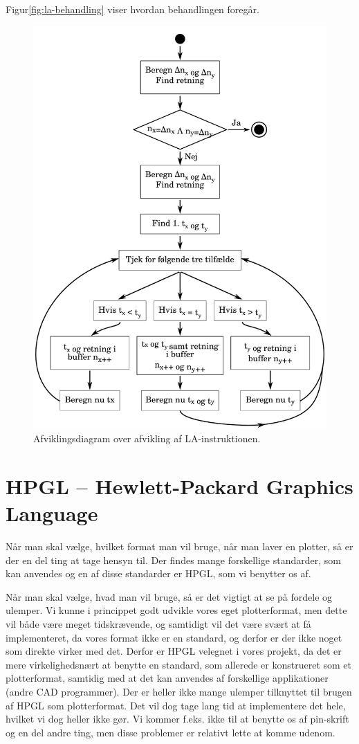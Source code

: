 Figur\vref{fig:la-behandling} viser hvordan behandlingen foregår.
\begin{figure}[htbp]
  \centering
  \includegraphics[width=.75\textwidth]{./img/la-behandling}
  \caption{Afviklingsdiagram over afvikling af LA-instruktionen.}
  \label{fig:la-behandling}
\end{figure}


\section{HPGL -- Hewlett-Packard Graphics Language}
\label{sec:hpgl}

Når man skal vælge, hvilket format man vil bruge, når man laver en
plotter, så er der en del ting at tage hensyn til. Der findes mange
forskellige standarder, som kan anvendes og en af disse standarder er
HPGL, som vi benytter os af.

Når man skal vælge, hvad man vil bruge, så er det vigtigt at se på
fordele og ulemper. Vi kunne i princippet godt udvikle vores eget
plotterformat, men dette vil både være meget tidskrævende, og
samtidigt vil det være svært at få implementeret, da vores format ikke
er en standard, og derfor er der ikke noget som direkte virker med
det. Derfor er HPGL velegnet i vores projekt, da det er mere
virkelighedsnært at benytte en standard, som allerede er konstrueret
som et plotterformat, samtidig med at det kan anvendes af forskellige
applikationer (andre CAD programmer). Der er heller ikke mange ulemper
tilknyttet til brugen af HPGL som plotterformat. Det vil dog tage lang
tid at implementere det hele, hvilket vi dog heller ikke gør. Vi
kommer f.eks. ikke til at benytte os af pin-skrift og en del andre
ting, men disse problemer er relativt lette at komme udenom.

